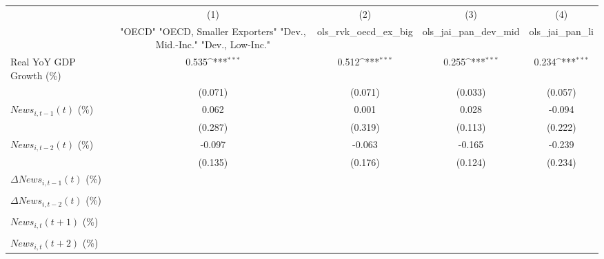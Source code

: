 {
\def\sym#1{\ifmmode^{#1}\else\(^{#1}\)\fi}
\begin{tabular}{l*{4}{c}}
\toprule
                    &\multicolumn{1}{c}{(1)}&\multicolumn{1}{c}{(2)}&\multicolumn{1}{c}{(3)}&\multicolumn{1}{c}{(4)}\\
                    &\multicolumn{1}{c}{ "OECD" "OECD, Smaller Exporters" "Dev., Mid.-Inc." "Dev., Low-Inc."}&\multicolumn{1}{c}{ols_rvk_oecd_ex_big}&\multicolumn{1}{c}{ols_jai_pan_dev_mid}&\multicolumn{1}{c}{ols_jai_pan_li}\\
\midrule
Real YoY GDP Growth (\%)&       0.535\sym{***}&       0.512\sym{***}&       0.255\sym{***}&       0.234\sym{***}\\
                    &     (0.071)         &     (0.071)         &     (0.033)         &     (0.057)         \\
\addlinespace
$ News_{i,t-1}(t)$ (\%)&       0.062         &       0.001         &       0.028         &      -0.094         \\
                    &     (0.287)         &     (0.319)         &     (0.113)         &     (0.222)         \\
\addlinespace
$ News_{i,t-2}(t)$ (\%)&      -0.097         &      -0.063         &      -0.165         &      -0.239         \\
                    &     (0.135)         &     (0.176)         &     (0.124)         &     (0.234)         \\
\addlinespace
$ \Delta News_{i,t-1}(t)$ (\%)&                     &                     &                     &                     \\
                    &                     &                     &                     &                     \\
\addlinespace
$ \Delta News_{i,t-2}(t)$ (\%)&                     &                     &                     &                     \\
                    &                     &                     &                     &                     \\
\addlinespace
$ News_{i,t}(t+1)$ (\%)&                     &                     &                     &                     \\
                    &                     &                     &                     &                     \\
\addlinespace
$ News_{i,t}(t+2)$ (\%)&                     &                     &                     &                     \\

\end{tabular}}
